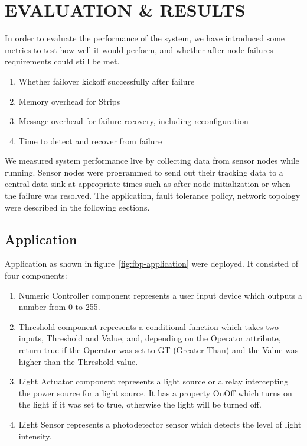 \cleardoublepage
\singlespacing
\chapter{EVALUATION \& RESULTS}
\label{c:evaluation}
\doublespacing\nointerlineskip

In order to evaluate the performance of the system, we have
introduced some metrics to test how well it would perform, and whether after node
failures requirements could still be met.

\begin{enumerate}
\item Whether failover kickoff successfully after failure
\item Memory overhead for Strips
\item Message overhead for failure recovery, including reconfiguration
\item Time to detect and recover from failure
\end{enumerate}

We measured system performance live by collecting data from sensor nodes while
running. Sensor nodes were programmed to send out their tracking data to
a central data sink at appropriate times such as after node initialization or
when the failure was resolved.
The application, fault tolerance policy, network topology were described in the
following sections.


\section{Application}

Application as shown in figure~\ref{fig:fbp-application} were deployed. It
consisted of four components: 

\begin{enumerate}
\item Numeric Controller component represents a user input device which outputs
a number from 0 to 255. 

\item Threshold component represents a conditional function which takes two
inputs, Threshold and Value, and, depending on the Operator attribute, return
true if the Operator was set to GT (Greater Than) and the Value was higher than
the Threshold value.

\item Light Actuator component represents a light source or a relay intercepting
the power source for a light source. It has a property OnOff which turns on the
light if it was set to true, otherwise the light will be turned off.

\item Light Sensor represents a photodetector sensor which detects the level of
light intensity. 
\end{enumerate}


